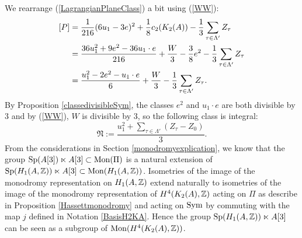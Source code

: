 We rearrange (\ref{LagrangianPlaneClass}) a bit using (\ref{WW}):
\begin{align*}
\left[P\right]&=\frac{1}{216}(6u_1-3e)^2+\frac{1}{8}c_2(K_{ 2 }( A ))-\frac{1}{3}\sum_{\tau\in \Lambda'} Z_{\tau}\\
&=\frac{36u_1^2+9e^2-36u_1\cdot e}{216} +\frac{W}{3}-\frac{3}{8}e^2-\frac{1}{3}\sum_{\tau\in \Lambda'} Z_{\tau}\\
&=\frac{u_1^2-2e^2-u_1\cdot e}{6} +\frac{W}{3}-\frac{1}{3}\sum_{\tau\in \Lambda'} Z_{\tau}.
\end{align*}
By Proposition \ref{classedivisibleSym}, the classes $e^2$ and $u_1\cdot e$ are both divisible by 3 and by (\ref{WW}), $W$ is divisible by 3, so the following class is integral:
$$
\mathfrak{N}:=\frac{u_1^2+\sum_{\tau\in \Lambda'} (Z_{\tau}-Z_0)}{3}
.
$$
From the considerations in Section \ref{monodromyexplication}, we know that the group $\operatorname{Sp}(A[3])\ltimes A[3]\subset \operatorname{Mon}(\Pi)$ is a natural extension of 
$\operatorname{Sp}(H_1(A,\mathbb{Z}))\ltimes A[3]\subset \operatorname{Mon}(H_1(A,\mathbb{Z}))$. Isometries of the image of the monodromy representation on $H_1(A,\mathbb{Z})$ extend naturally to isometries of the image of the monodromy representation of $H^4(K_2(A),\mathbb{Z})$ acting on $\Pi$ as describe in Proposition \ref{Hassettmonodromy} and acting on $\operatorname{Sym}$ by commuting with the map $j$ defined in Notation \ref{BasisH2KA}.
Hence the group $\operatorname{Sp}(H_1(A,\mathbb{Z}))\ltimes A[3]$ can be seen as a subgroup of $\operatorname{Mon}(H^4(K_2(A),\mathbb{Z}))$. 

